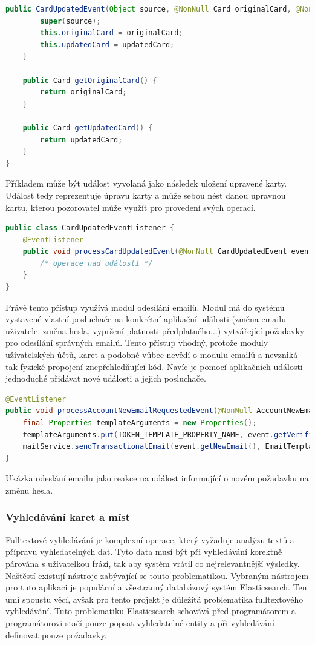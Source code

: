 \begin{itemize}
\begin{itemize}
\begin{lstlisting}[language=Java]
    public CardUpdatedEvent(Object source, @NonNull Card originalCard, @NonNull Card updatedCard) {
        super(source);
        this.originalCard = originalCard;
        this.updatedCard = updatedCard;
    }

    public Card getOriginalCard() {
        return originalCard;
    }

    public Card getUpdatedCard() {
        return updatedCard;
    }
}
		\end{lstlisting}
		Příkladem může být událost vyvolaná jako následek uložení upravené karty.
		Událost tedy reprezentuje úpravu karty a může sebou nést danou upravnou kartu, kterou pozorovatel může
		využít pro provedení svých operací.
		\begin{lstlisting}[language=Java]
public class CardUpdatedEventListener {
    @EventListener
    public void processCardUpdatedEvent(@NonNull CardUpdatedEvent event) {
        /* operace nad událostí */
    }
}
		\end{lstlisting}

		Právě tento přístup využívá modul odesílání emailů.
		Modul má do systému vystavené vlastní posluchače na konkrétní aplikační události (změna emailu uživatele, změna hesla,
		vypršení platnosti předplatného...) vytvářející požadavky pro odesílání správných emailů.
		Tento přístup vhodný, protože moduly uživatelských účtů, karet a podobně vůbec nevědí o modulu emailů a nevzniká
		tak fyzické propojení znepřehledňující kód.
		Navíc je pomocí aplikačních události jednoduché přidávat nové události a jejich posluchače.

		\begin{lstlisting}[language=Java]
@EventListener
public void processAccountNewEmailRequestedEvent(@NonNull AccountNewEmailRequestedEvent event) {
	final Properties templateArguments = new Properties();
	templateArguments.put(TOKEN_TEMPLATE_PROPERTY_NAME, event.getVerificationToken().getToken());
	mailService.sendTransactionalEmail(event.getNewEmail(), EmailTemplate.ACCOUNT_NEW_EMAIL, templateArguments);
}
		\end{lstlisting}
		Ukázka odeslání emailu jako reakce na událost informující o novém požadavku na změnu hesla. %

		\subsubsection{Vyhledávání karet a míst}

		Fulltextové vyhledávání je komplexní operace, který vyžaduje analýzu textů a přípravu vyhledatelných dat.
		Tyto data musí být při vyhledávání korektně párována s uživatelkou frází, tak aby systém vrátil co nejrelevantnější
		výsledky.
		Naštěstí existují nástroje zabývající se touto problematikou.
		Vybraným nástrojem pro tuto aplikaci je populární a všestranný databázový systém Elasticsearch.
		Ten umí spoustu věcí, avšak pro tento projekt je důležitá problematika fulltextového vyhledávání.
		Tuto problematiku Elasticsearch schovává před programátorem a programátorovi stačí pouze popsat
		vyhledatelné entity a při vyhledávání definovat pouze požadavky.


\end{itemize}
\end{itemize}
